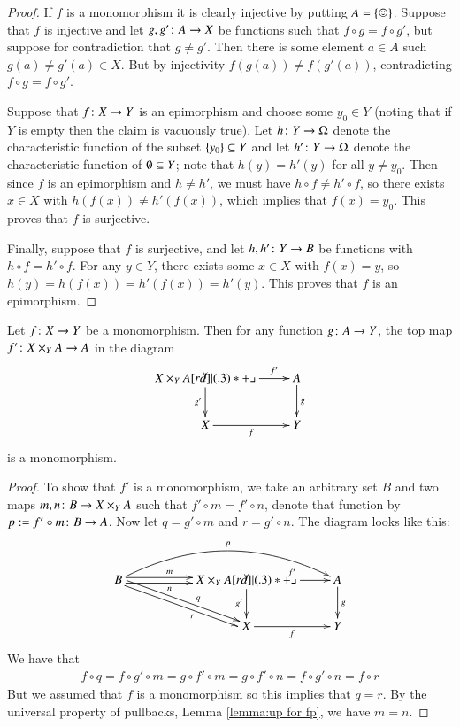 \begin{proof}

If $f$ is a monomorphism it is clearly injective by putting $A=\singleton$. Suppose that $f$ is injective and let $g,g'\taking A\to X$ be functions such that $f\circ g=f\circ g'$, but suppose for contradiction that $g\neq g'$. Then there is some element $a\in A$ such $g(a)\neq g'(a)\in X$. But by injectivity $f(g(a))\neq f(g'(a))$, contradicting $f\circ g=f\circ g'$.

Suppose that $f\taking X\to Y$ is an epimorphism and choose some $y_0\in Y$ (noting that if $Y$ is empty then the claim is vacuously true). Let $h\taking Y\to\Omega$ denote the characteristic function of the subset $\{y_0\}\ss Y$ and let $h'\taking Y\to\Omega$ denote the characteristic function of $\emptyset\ss Y$; note that $h(y)=h'(y)$ for all $y\neq y_0$. Then since $f$ is an epimorphism and $h\neq h'$, we must have $h\circ f\neq h'\circ f$, so there exists $x\in X$ with $h(f(x))\neq h'(f(x))$, which implies that $f(x)=y_0$. This proves that $f$ is surjective.

Finally, suppose that $f$ is surjective, and let $h,h'\taking Y\to B$ be functions with $h\circ f=h'\circ f$. For any $y\in Y$, there exists some $x\in X$ with $f(x)=y$, so $h(y)=h(f(x))=h'(f(x))=h'(y)$. This proves that $f$ is an epimorphism.

\end{proof}

\begin{proposition}\label{prop:pb preserve mono}

Let $f\taking X\to Y$ be a monomorphism. Then for any function $g\taking A\to Y$, the top map $f'\taking X\times_YA\to A$ in the diagram
$$
\xymatrix{X\times_YA\ar[r]^-{f'}\ar[d]_{g'}\ullimit&A\ar[d]^g\\X\ar[r]_f&Y}
$$
is a monomorphism.

\end{proposition}

\begin{proof}

To show that $f'$ is a monomorphism, we take an arbitrary set $B$ and two maps $m,n\taking B\to X\times_YA$ such that $f'\circ m=f'\circ n$, denote that function by $p:=f'\circ m\taking B\to A$. Now let $q=g'\circ m$ and $r=g'\circ n$. The diagram looks like this:
$$
\xymatrix{B\ar@<.5ex>[rr]^(.4)m\ar@<-.5ex>[rr]_(.4)n\ar@/^2pc/[rrr]^p\ar@<.5ex>[drr]^(.6)q\ar@<-.5ex>[drr]_(.6)r&&X\times_YA\ar[r]^{f'}\ar[d]_{g'}\ullimit&A\ar[d]^g\\&&X\ar[r]_f&Y}
$$
We have that 
\begin{align*}f\circ q=f\circ g'\circ m=g\circ f'\circ m=g\circ f'\circ n=f\circ g'\circ n=f\circ r\end{align*} 
But we assumed that $f$ is a monomorphism so this implies that $q=r$. By the universal property of pullbacks, Lemma \ref{lemma:up for fp}, we have $m=n$.

\end{proof}

